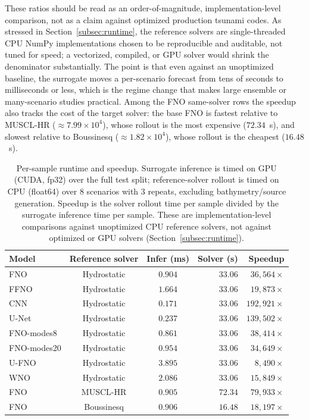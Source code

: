 These ratios should be read as an order-of-magnitude, implementation-level comparison, not as a claim against optimized production tsunami codes. As stressed in Section~\ref{subsec:runtime}, the reference solvers are single-threaded CPU NumPy implementations chosen to be reproducible and auditable, not tuned for speed; a vectorized, compiled, or GPU solver would shrink the denominator substantially. The point is that even against an unoptimized baseline, the surrogate moves a per-scenario forecast from tens of seconds to milliseconds or less, which is the regime change that makes large ensemble or many-scenario studies practical. Among the FNO same-solver rows the speedup also tracks the cost of the target solver: the base FNO is fastest relative to MUSCL-HR ($\approx 7.99 \times 10 ^ {4}$), whose rollout is the most expensive ($72.34$~s), and slowest relative to Boussinesq ($\approx 1.82 \times 10 ^ {4}$), whose rollout is the cheapest ($16.48$~s).

\begin{table}[!htbp]
\centering
\caption{Per-sample runtime and speedup. Surrogate inference is timed on GPU (CUDA, fp32) over the full test split; reference-solver rollout is timed on CPU (float64) over $8$ scenarios with $3$ repeats, excluding bathymetry/source generation. Speedup is the solver rollout time per sample divided by the surrogate inference time per sample. These are implementation-level comparisons against unoptimized CPU reference solvers, not against optimized or GPU solvers (Section~\ref{subsec:runtime}).}
\label{tab:speed}
\begin{tabular}{lccrr}
    \toprule
    Model & Reference solver & Infer (ms) & Solver (s) & Speedup \\
    \midrule
    FNO         & Hydrostatic & $0.904$ & $33.06$ & $36{,}564  \times$ \\
    FFNO        & Hydrostatic & $1.664$ & $33.06$ & $19{,}873  \times$ \\
    CNN         & Hydrostatic & $0.171$ & $33.06$ & $192{,}921 \times$ \\
    U-Net       & Hydrostatic & $0.237$ & $33.06$ & $139{,}502 \times$ \\
    FNO-modes8  & Hydrostatic & $0.861$ & $33.06$ & $38{,}414  \times$ \\
    FNO-modes20 & Hydrostatic & $0.954$ & $33.06$ & $34{,}649  \times$ \\
    U-FNO       & Hydrostatic & $3.895$ & $33.06$ & $8{,}490   \times$ \\
    WNO         & Hydrostatic & $2.086$ & $33.06$ & $15{,}849  \times$ \\
    FNO         & MUSCL-HR    & $0.905$ & $72.34$ & $79{,}933  \times$ \\
    FNO         & Boussinesq  & $0.906$ & $16.48$ & $18{,}197  \times$ \\
    \bottomrule
\end{tabular}
\end{table}

